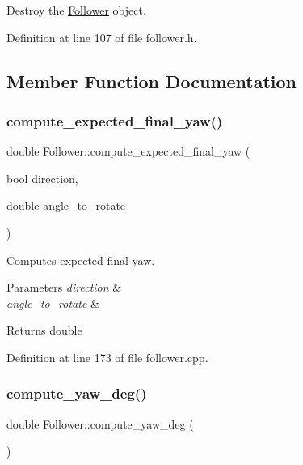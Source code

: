 Destroy the \hyperlink{class_follower}{Follower} object. 



Definition at line 107 of file follower.\+h.



\subsection{Member Function Documentation}
\mbox{\label{class_follower_a5573bec72ce4aed99706213154849b65}} 
\subsubsection{\texorpdfstring{compute\+\_\+expected\+\_\+final\+\_\+yaw()}{compute\_expected\_final\_yaw()}}
{\footnotesize\ttfamily double Follower\+::compute\+\_\+expected\+\_\+final\+\_\+yaw (\begin{DoxyParamCaption}\item[{bool}]{direction,  }\item[{double}]{angle\+\_\+to\+\_\+rotate }\end{DoxyParamCaption})}



Computes expected final yaw. 


\begin{DoxyParams}{Parameters}
{\em direction} & \\
\hline
{\em angle\+\_\+to\+\_\+rotate} & \\
\hline
\end{DoxyParams}
\begin{DoxyReturn}{Returns}
double 
\end{DoxyReturn}


Definition at line 173 of file follower.\+cpp.

\mbox{\label{class_follower_ac988cad87474cb64ef3be7fe197d90a7}} 
\subsubsection{\texorpdfstring{compute\+\_\+yaw\+\_\+deg()}{compute\_yaw\_deg()}}
{\footnotesize\ttfamily double Follower\+::compute\+\_\+yaw\+\_\+deg (\begin{DoxyParamCaption}{ }\end{DoxyParamCaption})}



